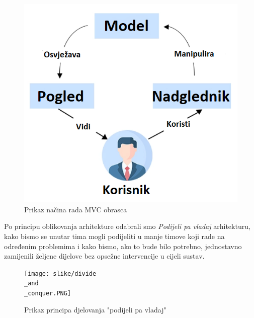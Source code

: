 			\begin{figure}[H]
			\includegraphics[scale=0.4]{slike/mvc.PNG} %
			\centering
			\caption{Prikaz načina rada MVC obrasca}
			\label{mvc}
		\end{figure}
		
	Po principu oblikovanja arhitekture odabrali smo \textit{Podijeli pa vladaj} arhitekturu, kako bismo se unutar tima mogli podijeliti u manje timove koji rade na određenim problemima i kako bismo, ako to bude bilo potrebno, jednostavno zamijenili željene dijelove bez opsežne intervencije u cijeli sustav.
	
			\begin{figure}[H]
			\texttt{[image: slike/divide\\\_and\\\_conquer.PNG]} %
			\centering
			\caption{Prikaz principa djelovanja "podijeli pa vladaj"}
			\label{divide_and_conquer}
		\end{figure}
		
